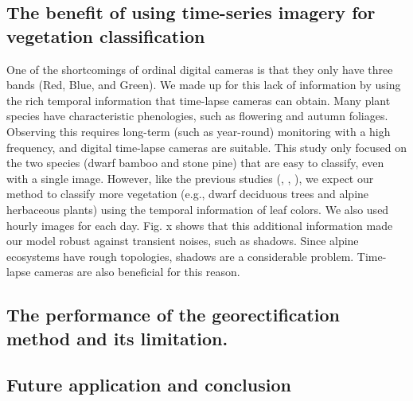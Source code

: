\documentclass{article}
\begin{document}
\hypertarget{the-benefit-of-using-time-series-imagery-for-vegetation-classification}{%
\subsection{The benefit of using time-series imagery for vegetation classification}\label{the-benefit-of-using-time-series-imagery-for-vegetation-classification}}

One of the shortcomings of ordinal digital cameras is that they only have three bands (Red, Blue, and Green). We made up for this lack of information by using the rich temporal information that time-lapse cameras can obtain. Many plant species have characteristic phenologies, such as flowering and autumn foliages. Observing this requires long-term (such as year-round) monitoring with a high frequency, and digital time-lapse cameras are suitable. This study only focused on the two species (dwarf bamboo and stone pine) that are easy to classify, even with a single image. However, like the previous studies (\cite{Tigges2013RemSenEnv}, \cite{Son2013RemSen}, \cite{Heupel2018PFG}), we expect our method to classify more vegetation (e.g., dwarf deciduous trees and alpine herbaceous plants) using the temporal information of leaf colors. We also used hourly images for each day. Fig. x shows that this additional information made our model robust against transient noises, such as shadows. Since alpine ecosystems have rough topologies, shadows are a considerable problem. Time-lapse cameras are also beneficial for this reason.

\hypertarget{the-performance-of-the-georectification-method-and-its-limitation.}{%
\subsection{The performance of the georectification method and its limitation.}\label{the-performance-of-the-georectification-method-and-its-limitation.}}

\hypertarget{future-application-and-conclusion}{%
\subsection{Future application and conclusion}\label{future-application-and-conclusion}}



\end{document}
